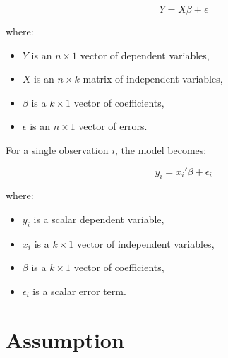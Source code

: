 \documentclass[11pt]{article}
\begin{document}
\[
Y = X \beta + \epsilon
\]

where:
\begin{itemize}
    \item \(Y\) is an \(n \times 1\) vector of dependent variables,
    \item \(X\) is an \(n \times k\) matrix of independent variables,
    \item \(\beta\) is a \(k \times 1\) vector of coefficients,
    \item \(\epsilon\) is an \(n \times 1\) vector of errors.
\end{itemize}

For a single observation \(i\), the model becomes:

\[
y_i = x_i' \beta + \epsilon_i
\]

where:
\begin{itemize}
    \item \(y_i\) is a scalar dependent variable,
    \item \(x_i\) is a \(k \times 1\) vector of independent variables,
    \item \(\beta\) is a \(k \times 1\) vector of coefficients,
    \item \(\epsilon_i\) is a scalar error term.
\end{itemize}

\section{Assumption}
\end{document}
